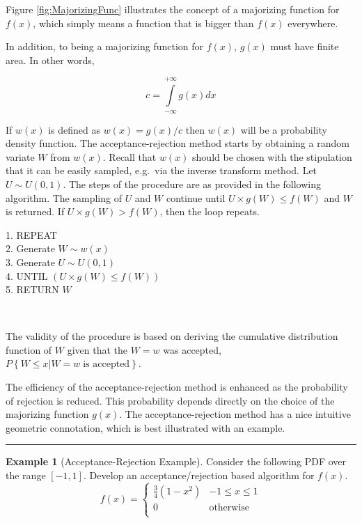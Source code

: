 \documentclass[
]{book}
\theoremstyle{definition}
\theoremstyle{definition}
\newtheorem{example}{Example}[chapter]
\theoremstyle{definition}
\theoremstyle{definition}
\theoremstyle{remark}
\begin{document}
Figure \ref{fig:MajorizingFunc} illustrates the concept of a majorizing
function for \(f(x)\), which simply means a function that is bigger than
\(f(x)\) everywhere.

In addition, to being a majorizing function for \(f(x)\), \(g(x)\) must have
finite area. In other words,

\[
c = \int\limits_{-\infty}^{+\infty} g(x) dx
\]

If \(w(x)\) is defined as \(w(x) = g(x)/c\) then \(w(x)\) will be a
probability density function. The acceptance-rejection method starts by
obtaining a random variate \(W\) from \(w(x)\). Recall that \(w(x)\) should be
chosen with the stipulation that it can be easily sampled, e.g.~via the
inverse transform method. Let \(U \sim U(0,1)\). The steps of the
procedure are as provided in the following algorithm. The sampling of
\(U\) and \(W\) continue until \(U \times g(W) \leq f(W)\) and \(W\) is
returned. If \(U \times g(W) > f(W)\), then the loop repeats.

1. REPEAT\\
2. Generate \(W \sim w(x)\)\\
3. Generate \(U \sim U(0,1)\)\\
4. UNTIL \((U \times g(W) \leq f(W))\)\\
5. RETURN \(W\)

~

The validity of the procedure is based on deriving the cumulative
distribution function of \(W\) given that the \(W=w\) was accepted,
\(P\left\{W \leq x \vert W = w \; \text{is accepted}\right\}\).

The efficiency of the acceptance-rejection method is enhanced as the
probability of rejection is reduced. This probability depends directly
on the choice of the majorizing function \(g(x)\). The
acceptance-rejection method has a nice intuitive geometric connotation,
which is best illustrated with an example.

\begin{center}\rule{0.5\linewidth}{0.5pt}\end{center}

\begin{example}[Acceptance-Rejection Example]
\protect\hypertarget{exm:ARExampleRV}{}{\label{exm:ARExampleRV} {} }Consider the
following PDF over the range \(\left[-1,1\right]\). Develop an
acceptance/rejection based algorithm for \(f(x)\).
\[
f(x) =
\begin{cases}
\frac{3}{4}\left( 1 - x^2 \right) &     -1 \leq x \leq 1\\
0 & \text{otherwise}\\
\end{cases}
\]
\end{example}
\end{document}
